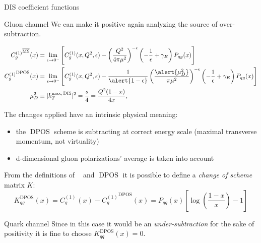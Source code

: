 \documentclass[8pt]{beamer}
\DeclareMathOperator{\msbar}{\overline{MS}}
\DeclareMathOperator{\dpos}{DPOS}
\begin{document}
\begin{frame}{DIS coefficient functions}
    \begin{block}{Gluon channel}
    \vspace*{1pt}
    We can make it positive again analyzing the source of over-subtraction.
    \end{block}

    \begin{align*}
        {C^{(1)}_{g}}^{\msbar}(x) &= \lim_{\epsilon\to
        0^-}\left[C_{g}^{(1)}(x,Q^2,\epsilon) - \left(\frac{Q^2}{4\pi
        \mu^2}\right)^{-\epsilon} \left(-\frac 1
        {\epsilon}+\gamma_E\right) P_{qg}(x)\right]\\
        {C^{(1)}_{g}}^{\dpos}(x) &= \lim_{\epsilon\to0^-}
        \left[{C^{(1)}_{g}}(x,Q^2,\epsilon) -
        \frac{1}{\alert{1-\epsilon}}\left(\frac{\alert{\mu_D^2}}{\pi\mu^2}\right)^{-\epsilon}
        \left(-\frac 1 {\epsilon}+\gamma_E\right) P_{qg}(x)\right]\\
        \mu_D^2&\equiv|k_T^{\text{max,\,DIS}}|^2=\frac{s}{4}=\frac{Q^2(1-x)}{4x},
    \end{align*}

    The changes applied have an intrinsic physical meaning:
    \begin{itemize}
        \item the $\dpos$ scheme is subtracting at correct energy scale
            (maximal transverse momentum, not virtuality)
        \item d-dimensional gluon polarizations' average is taken into
            account
    \end{itemize}

    \vspace*{5pt}
    From the definitions of $\msbar$ and $\dpos$ it is possible to define a
    \textit{change of scheme} matrix $K$:
    \begin{equation*}
      K_{qg}^{\dpos}(x)= {C^{(1)}_{g}}^{\msbar}(x) - {C^{(1)}_{g}}^{\dpos}(x) = P_{qg}(x)\left[\log(\frac{1-x}{x}) - 1\right]
    \end{equation*}

    \begin{block}{Quark channel}
    \vspace*{1pt}
    Since in this case it would be an \textit{under-subtraction} for the sake
    of positivity it is fine to choose $K_{qq}^{\dpos}(x) = 0$.
    \end{block}
\end{frame}
\end{document}
